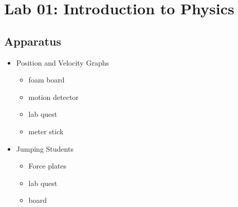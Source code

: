 


\renewcommand\assignment{Lab 0: Introduction to Physics, 1/24/2023, Partner: }



    \iffalse
    \begin{equation*}
        \begin{gathered}
            Equations go here.
        \end{gathered}
    \end{equation*}

    \resizebox{\hsize}{!}{$Long equation goes here$}

    \begin{multicol*}{# of columns}
    \end{multicol*}

    \horizontal

    \fi


    \section*{Lab 01: Introduction to Physics}

    \subsection*{Apparatus}

    \begin{itemize}
        \item Position and Velocity Graphs
        \begin{itemize}
            \item foam board
            \item motion detector
            \item lab quest
            \item meter stick
        \end{itemize}
        \item Jumping Students
        \begin{itemize}
            \item Force plates
            \item lab quest
            \item board
        \end{itemize}
    \end{itemize}

